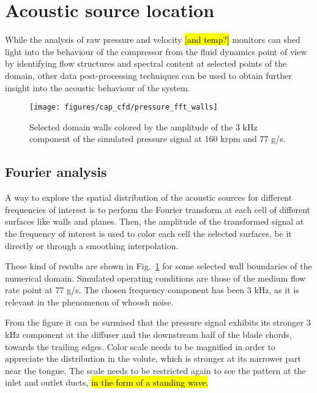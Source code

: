 
\section{Acoustic source location}

While the analysis of raw pressure and velocity \hl{[and temp?]} monitors can shed light into the behaviour of the compressor from the fluid dynamics point of view by identifying flow structures and spectral content at selected points of the domain, other data post-processing techniques can be used to obtain further insight into the acoustic behaviour of the system.   

\begin{figure}[htb!]
\hspace{-0.05\textwidth}
\texttt{[image: figures/cap\_cfd/pressure\_fft\_walls]}
\caption{Selected domain walls colored by the amplitude of the 3 kHz component of the simulated pressure signal at 160 krpm and 77 g/s.}
\label{fig:pressure_fft_walls}
\end{figure}

\subsection{Fourier analysis}

A way to explore the spatial distribution of the acoustic sources for different frequencies of interest is to perform the Fourier transform at each cell of different surfaces like walls and planes. Then, the amplitude of the transformed signal at the frequency of interest is used to color each cell the selected surfaces, be it directly or through a smoothing interpolation.

These kind of results are shown in Fig.~\ref{fig:pressure_fft_walls} for some selected wall boundaries of the numerical domain. Simulated operating conditions are those of the medium flow rate point at 77 g/s. The chosen frequency component has been 3 kHz, as it is relevant in the phenomenon of whoosh noise.

From the figure it can be surmised that the pressure signal exhibits its stronger 3 kHz component at the diffuser and the downstream half of the blade chords, towards the trailing edges. Color scale needs to be magnified in order to appreciate the distribution in the volute, which is stronger at its narrower part near the tongue. The scale needs to be restricted again to see the pattern at the inlet and outlet ducts, \hl{in the form of a standing wave.}

